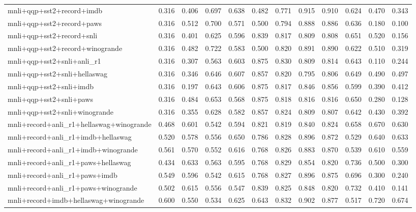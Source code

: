 \begin{table}[t]
\begin{tabular}{lrrrrrrrrrrr}
    mnli+qqp+sst2+record+imdb & 0.316 & 0.406 & 0.697 & 0.638 & 0.482 & 0.771 & 0.915 & 0.910 & 0.624 & 0.470 & 0.343 \\
    mnli+qqp+sst2+record+paws & 0.316 & 0.512 & 0.700 & 0.571 & 0.500 & 0.794 & 0.888 & 0.886 & 0.636 & 0.180 & 0.100 \\
    mnli+qqp+sst2+record+snli & 0.316 & 0.401 & 0.625 & 0.596 & 0.839 & 0.817 & 0.809 & 0.808 & 0.651 & 0.520 & 0.156 \\
    mnli+qqp+sst2+record+winogrande & 0.316 & 0.482 & 0.722 & 0.583 & 0.500 & 0.820 & 0.891 & 0.890 & 0.622 & 0.510 & 0.319 \\
    mnli+qqp+sst2+snli+anli\_r1 & 0.316 & 0.307 & 0.563 & 0.603 & 0.875 & 0.830 & 0.809 & 0.814 & 0.643 & 0.110 & 0.244 \\
    mnli+qqp+sst2+snli+hellaswag & 0.316 & 0.346 & 0.646 & 0.607 & 0.857 & 0.820 & 0.795 & 0.806 & 0.649 & 0.490 & 0.497 \\
    mnli+qqp+sst2+snli+imdb & 0.316 & 0.197 & 0.643 & 0.606 & 0.875 & 0.817 & 0.846 & 0.856 & 0.599 & 0.390 & 0.412 \\
    mnli+qqp+sst2+snli+paws & 0.316 & 0.484 & 0.653 & 0.568 & 0.875 & 0.818 & 0.816 & 0.816 & 0.650 & 0.280 & 0.128 \\
    mnli+qqp+sst2+snli+winogrande & 0.316 & 0.355 & 0.628 & 0.582 & 0.857 & 0.824 & 0.809 & 0.807 & 0.642 & 0.430 & 0.392 \\
    mnli+record+anli\_r1+hellaswag+winogrande & 0.468 & 0.601 & 0.542 & 0.594 & 0.821 & 0.819 & 0.840 & 0.824 & 0.658 & 0.670 & 0.630 \\
    mnli+record+anli\_r1+imdb+hellaswag & 0.520 & 0.578 & 0.556 & 0.650 & 0.786 & 0.828 & 0.896 & 0.872 & 0.529 & 0.640 & 0.633 \\
    mnli+record+anli\_r1+imdb+winogrande & 0.561 & 0.570 & 0.552 & 0.616 & 0.768 & 0.826 & 0.883 & 0.870 & 0.539 & 0.610 & 0.559 \\
    mnli+record+anli\_r1+paws+hellaswag & 0.434 & 0.633 & 0.563 & 0.595 & 0.768 & 0.829 & 0.854 & 0.820 & 0.736 & 0.500 & 0.300 \\
    mnli+record+anli\_r1+paws+imdb & 0.549 & 0.596 & 0.542 & 0.615 & 0.768 & 0.827 & 0.896 & 0.875 & 0.696 & 0.300 & 0.240 \\
    mnli+record+anli\_r1+paws+winogrande & 0.502 & 0.615 & 0.556 & 0.547 & 0.839 & 0.825 & 0.848 & 0.820 & 0.732 & 0.410 & 0.141 \\
    mnli+record+imdb+hellaswag+winogrande & 0.600 & 0.550 & 0.534 & 0.625 & 0.643 & 0.832 & 0.902 & 0.877 & 0.517 & 0.720 & 0.674 \\

\end{tabular}
\end{table}
